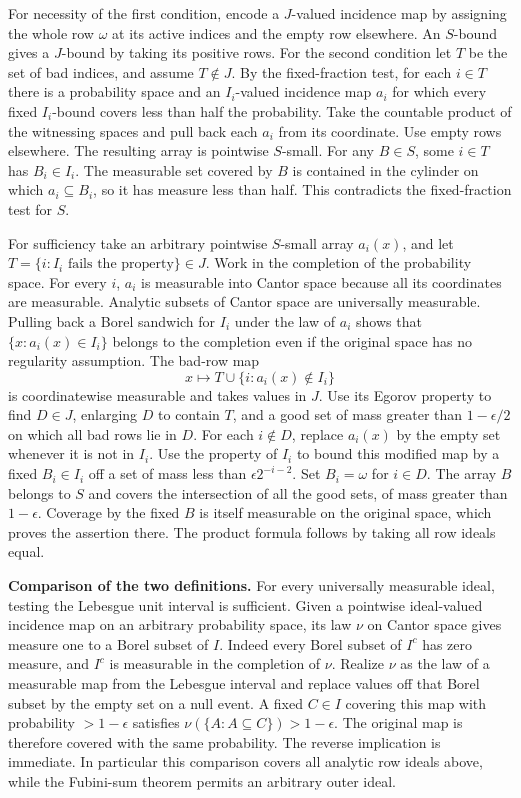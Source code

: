 \documentclass[11pt]{article}
\begin{document}
For necessity of the first condition, encode a \(J\)-valued incidence map by assigning the whole row \(\omega\) at its active indices and the empty row elsewhere. An \(S\)-bound gives a \(J\)-bound by taking its positive rows. For the second condition let \(T\) be the set of bad indices, and assume \(T\notin J\). By the fixed-fraction test, for each \(i\in T\) there is a probability space and an \(I_i\)-valued incidence map \(a_i\) for which every fixed \(I_i\)-bound covers less than half the probability. Take the countable product of the witnessing spaces and pull back each \(a_i\) from its coordinate. Use empty rows elsewhere. The resulting array is pointwise \(S\)-small. For any \(B\in S\), some \(i\in T\) has \(B_i\in I_i\). The measurable set covered by \(B\) is contained in the cylinder on which \(a_i\subseteq B_i\), so it has measure less than half. This contradicts the fixed-fraction test for \(S\).

For sufficiency take an arbitrary pointwise \(S\)-small array \(a_i(x)\), and let \(T=\{i:I_i\text{ fails the property}\}\in J\). Work in the completion of the probability space. For every \(i\), \(a_i\) is measurable into Cantor space because all its coordinates are measurable. Analytic subsets of Cantor space are universally measurable. Pulling back a Borel sandwich for \(I_i\) under the law of \(a_i\) shows that \(\{x:a_i(x)\in I_i\}\) belongs to the completion even if the original space has no regularity assumption. The bad-row map \[x\longmapsto T\cup\{i:a_i(x)\notin I_i\}\] is coordinatewise measurable and takes values in \(J\). Use its Egorov property to find \(D\in J\), enlarging \(D\) to contain \(T\), and a good set of mass greater than \(1-\epsilon/2\) on which all bad rows lie in \(D\). For each \(i\notin D\), replace \(a_i(x)\) by the empty set whenever it is not in \(I_i\). Use the property of \(I_i\) to bound this modified map by a fixed \(B_i\in I_i\) off a set of mass less than \(\epsilon 2^{-i-2}\). Set \(B_i=\omega\) for \(i\in D\). The array \(B\) belongs to \(S\) and covers the intersection of all the good sets, of mass greater than \(1-\epsilon\). Coverage by the fixed \(B\) is itself measurable on the original space, which proves the assertion there. The product formula follows by taking all row ideals equal.

\textbf{Comparison of the two definitions.} For every universally measurable ideal, testing the Lebesgue unit interval is sufficient. Given a pointwise ideal-valued incidence map on an arbitrary probability space, its law \(\nu\) on Cantor space gives measure one to a Borel subset of \(I\). Indeed every Borel subset of \(I^c\) has zero measure, and \(I^c\) is measurable in the completion of \(\nu\). Realize \(\nu\) as the law of a measurable map from the Lebesgue interval and replace values off that Borel subset by the empty set on a null event. A fixed \(C\in I\) covering this map with probability \(>1-\epsilon\) satisfies \(\nu(\{A:A\subseteq C\})>1-\epsilon\). The original map is therefore covered with the same probability. The reverse implication is immediate. In particular this comparison covers all analytic row ideals above, while the Fubini-sum theorem permits an arbitrary outer ideal.
\end{document}
